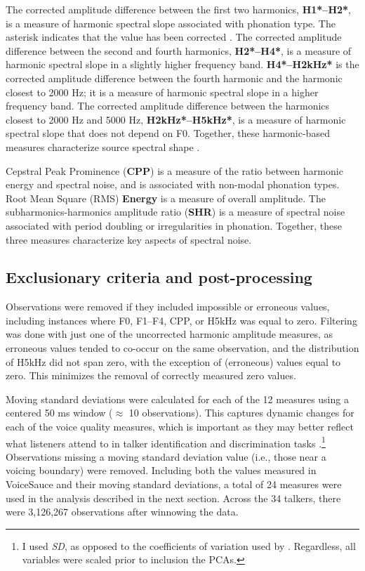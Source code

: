The corrected amplitude difference between the first two harmonics, \textbf{H1*--H2*}, is a measure of harmonic spectral slope associated with phonation type. The asterisk indicates that the value has been corrected \citep{iseli_2007_voice}. The corrected amplitude difference between the second and fourth harmonics, \textbf{H2*--H4*}, is a measure of harmonic spectral slope in a slightly higher frequency band. \textbf{H4*--H2kHz*} is the corrected amplitude difference between the fourth harmonic and the harmonic closest to 2000 Hz; it is a measure of harmonic spectral slope in a higher frequency band. The corrected amplitude difference between the harmonics closest to 2000 Hz and 5000 Hz, \textbf{H2kHz*--H5kHz*}, is a measure of harmonic spectral slope that does not depend on F0. Together, these harmonic-based measures characterize source spectral shape \citep{kreiman_2014_theory}. 

Cepstral Peak Prominence (\textbf{CPP}) is a measure of the ratio between harmonic energy and spectral noise, and is associated with non-modal phonation types. Root Mean Square (RMS) \textbf{Energy} is a measure of overall amplitude. The subharmonics-harmonics amplitude ratio (\textbf{SHR}) is a measure of spectral noise associated with period doubling or irregularities in phonation. Together, these three measures characterize key aspects of spectral noise. 

\subsection{Exclusionary criteria and post-processing}
Observations were removed if they included impossible or erroneous values, including instances where F0, F1--F4, CPP, or H5kHz was equal to zero. Filtering was done with just one of the uncorrected harmonic amplitude measures, as erroneous values tended to co-occur on the same observation, and the distribution of H5kHz did not span zero, with the exception of (erroneous) values equal to zero. This minimizes the removal of correctly measured zero values.

Moving standard deviations were calculated for each of the 12 measures using a centered 50 ms window ($\approx$ 10 observations). This captures dynamic changes for each of the voice quality measures, which is important as they may better reflect what listeners attend to in talker identification and discrimination tasks \citep{lee_2019_acoustic-paper}.\footnote{I used \textit{SD}, as opposed to the coefficients of variation used by \citet{lee_2019_acoustic-paper}. Regardless, all variables were scaled prior to inclusion the PCAs.} Observations missing a moving standard deviation value (i.e., those near a voicing boundary) were removed. Including both the values measured in VoiceSauce and their moving standard deviations, a total of 24 measures were used in the analysis described in the next section. Across the 34 talkers, there were 3,126,267 observations after winnowing the data. 

